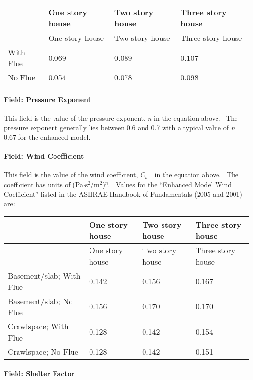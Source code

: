 \begin{longtable}[c]{@{}llll@{}}
\toprule
~ & One story house & Two story house & Three story house \tabularnewline
\midrule
\endfirsthead

\toprule
~ & One story house & Two story house & Three story house \tabularnewline
\midrule
\endhead

With Flue & 0.069 & 0.089 & 0.107 \tabularnewline
No Flue & 0.054 & 0.078 & 0.098 \tabularnewline
\bottomrule
\end{longtable}

\paragraph{Field: Pressure Exponent}\label{field-pressure-exponent}

This field is the value of the pressure exponent, \emph{n} in the equation above.~ The pressure exponent generally lies between 0.6 and 0.7 with a typical value of \emph{n} = 0.67 for the enhanced model.

\paragraph{Field: Wind Coefficient}\label{field-wind-coefficient-1}

This field is the value of the wind coefficient, \({C_w}\) ~in the equation above.~ The coefficient has units of (Pa$\cdot$s\(^{2}\)/m\(^{2}\))\(^{n}\).~ Values for the ``Enhanced Model Wind Coefficient'' listed in the ASHRAE Handbook of Fundamentals (2005 and 2001) are:

\begin{longtable}[c]{p{1.5in}p{1.5in}p{1.5in}p{1.5in}}
\toprule
~ & One story house & Two story house & Three story house \tabularnewline
\midrule
\endfirsthead

\toprule
~ & One story house & Two story house & Three story house \tabularnewline
\midrule
\endhead

Basement/slab; With Flue & 0.142 & 0.156 & 0.167 \tabularnewline
Basement/slab; No Flue & 0.156 & 0.170 & 0.170 \tabularnewline
Crawlspace; With Flue & 0.128 & 0.142 & 0.154 \tabularnewline
Crawlspace; No Flue & 0.128 & 0.142 & 0.151 \tabularnewline
\bottomrule
\end{longtable}

\paragraph{Field: Shelter Factor}\label{field-shelter-factor}

